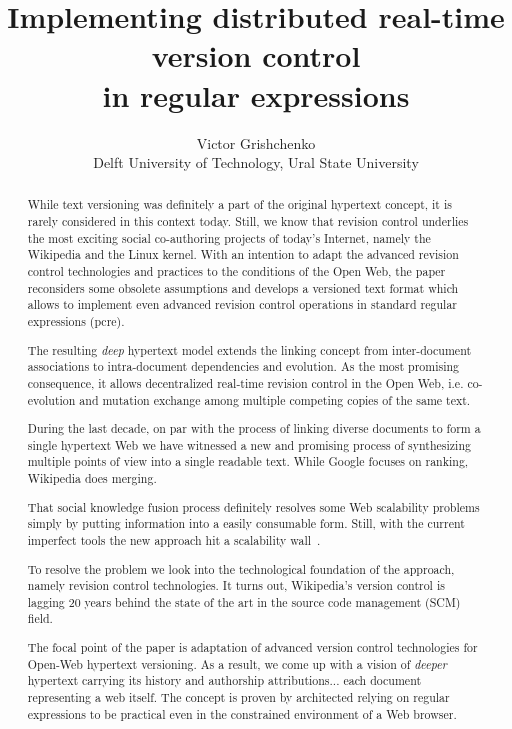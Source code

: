 \documentclass[twocolumn]{article}
\date{}
\begin{document}
\title{ Implementing distributed real-time version control \\in regular expressions }

\author{Victor Grishchenko \\ \small Delft University of Technology, Ural State University }

\maketitle

\begin{abstract}
While text versioning was definitely a part of the original
hypertext concept, it is rarely considered in this context today.
Still, we know that revision control underlies the most exciting
social co-authoring projects of today's Internet, namely the
Wikipedia and the Linux kernel. With an intention to adapt the
advanced revision control technologies and practices to the
conditions of the Open Web, the paper reconsiders some obsolete
assumptions and develops a versioned text format which allows to
implement even advanced revision control operations in standard
regular expressions (pcre).

The resulting \emph{deep} hypertext model extends the linking
concept from inter-document associations to intra-document
dependencies and evolution. As the most promising consequence,
it allows decentralized real-time revision control in the Open
Web, i.e. co-evolution and mutation exchange among multiple
competing copies of the same text. 

During the last decade, on par with the process of linking diverse documents to form a single hypertext Web we have witnessed a new and promising process of synthesizing multiple points of view into a single readable text. While Google focuses on ranking, Wikipedia does merging.

That social knowledge fusion process definitely resolves some Web scalability problems simply by putting information into a easily consumable form. Still, with the current imperfect tools the new approach hit a scalability wall~\cite{wp-scale}.

To resolve the problem we look into the technological foundation of the approach, namely revision control technologies. It turns out, Wikipedia's version control is lagging 20 years behind the state of the art in the source code management (SCM) field. 

The focal point of the paper is adaptation of advanced version control technologies for Open-Web hypertext versioning. As a result, we come up with a vision of \emph{deeper} hypertext carrying its history and authorship attributions... each document representing a web itself.
The concept is proven by architected relying on regular expressions to be practical even in the constrained environment of a Web browser.



\end{abstract}
\end{document}
